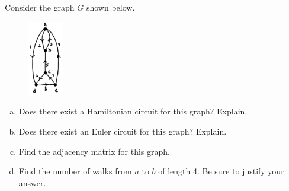 \documentclass[11pt,letterpaper]{article}
\begin{document}
\newpage



 Consider the graph $G$ shown below.
	\begin{figure}[h]
	\centering
	\includegraphics[width=0.14\textwidth]{graph2.jpg}
	\end{figure}

\begin{enumerate}[(a)]
\item Does there exist a Hamiltonian circuit for this graph? Explain. 
\item Does there exist an Euler circuit for this graph? Explain. 
\item Find the adjacency matrix for this graph.
\item Find the number of walks from $a$ to $b$ of length 4. Be sure to justify your answer. 
\end{enumerate} \pspace
\end{document}
